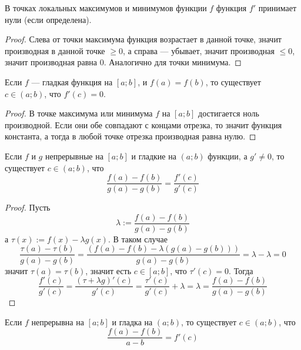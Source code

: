 \documentclass[12pt,a4paper]{article}
\begin{document}
    \begin{theorem}
        В точках локальных максимумов и минимумов функции $f$ функция $f'$ принимает нули (если определена).
    \end{theorem}

    \begin{proof}
        Слева от точки максимума функция возрастает в данной точке, значит производная в данной точке $\geqslant 0$, а справа --- убывает, значит производная $\leqslant 0$, значит производная равна $0$. Аналогично для точки минимума.
    \end{proof}

    \begin{theorem}[Ролль]
        Если $f$ --- гладкая функция на $[a; b]$, и $f(a) = f(b)$, то существует $c \in (a; b)$, что $f'(c) = 0$.
    \end{theorem}

    \begin{proof}
        В точке максимума или минимума $f$ на $[a;b]$ достигается ноль производной. Если они обе совпадают с концами отрезка, то значит функция константа, а тогда в любой точке отрезка производная равна нулю.
    \end{proof}

    \begin{theorem}
        Если $f$ и $g$ непрерывные на $[a; b]$ и гладкие на $(a; b)$ функции, а $g' \neq 0$, то существует $c \in (a; b)$, что
        \[\frac{f(a) - f(b)}{g(a) - g(b)} = \frac{f'(c)}{g'(c)}\]
    \end{theorem}

    \begin{proof}
        Пусть
        \[\lambda := \frac{f(a) - f(b)}{g(a) - g(b)}\]
        а $\tau(x) := f(x) - \lambda g(x)$. В таком случае
        \[\frac{\tau(a) - \tau(b)}{g(a) - g(b)} = \frac{(f(a) - f(b) - \lambda (g(a) - g(b)))}{g(a) - g(b)} = \lambda - \lambda = 0\]
        значит $\tau(a) = \tau(b)$, значит есть $c \in [a; b]$, что $\tau'(c) = 0$. Тогда
        \[\frac{f'(c)}{g'(c)} = \frac{(\tau + \lambda g)'(c)}{g'(c)} = \frac{\tau'(c)}{g'(c)} + \lambda = \lambda = \frac{f(a) - f(b)}{g(a) - g(b)}\]
    \end{proof}

    \begin{theorem}[Лагранж]
        Если $f$ непрерывна на $[a; b]$ и гладка на $(a; b)$, то существует $c \in (a; b)$, что
        \[\frac{f(a) - f(b)}{a - b} = f'(c)\]
    \end{theorem}
\end{document}
